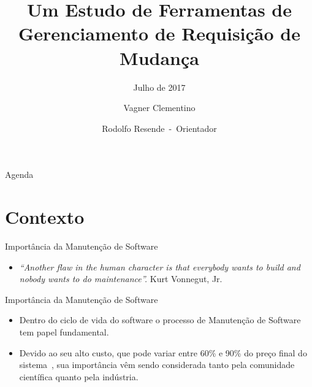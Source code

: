 \documentclass[t,14pt,mathserif]{beamer}
\title[] %
{Um Estudo de Ferramentas de \\
Gerenciamento de Requisição de Mudança}
\subtitle{Julho de 2017}
\author[] %
{Vagner Clementino\\%
	\and Rodolfo Resende~-~Orientador%
	}
\institute[] %
{Departamento de Ciência da Computação\\
 Universidade Federal de Minas Gerais
}
\date[2017/07/13] %
\begin{document}
\begin{frame}
  \titlepage{}
\end{frame}

\begin{frame}{Agenda}
  \tableofcontents[pausesections]
\end{frame}




\section{Contexto}

\begin{frame}{Importância da Manutenção de Software}
\begin{itemize}
    \item \textit{``Another flaw in the human character is that everybody wants to build
        and nobody wants to do maintenance''.} Kurt Vonnegut, Jr.
\end{itemize}
\end{frame}

\begin{frame}{Importância da Manutenção de Software}
	\begin{itemize}
        \item Dentro do ciclo de vida do software o processo de Manutenção de
            Software tem papel fundamental.
        \item Devido ao seu alto custo, que pode variar entre 60\% e 90\% do
            preço final do sistema~\cite{kaur2015review}, sua importância vêm
            sendo considerada tanto pela comunidade científica quanto pela
            indústria.
	\end{itemize}
\end{frame}
\end{document}
